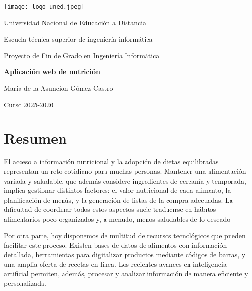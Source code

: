 \documentclass{article}
\begin{document}
\begin{titlepage}
\centering
\texttt{[image: logo-uned.jpeg]}

\vspace{1.5cm}

{\Large Universidad Nacional de Educación a Distancia\par}
\vspace{0.4cm}
{\large Escuela técnica superior de ingeniería informática\par}

\vspace{1.6cm}

{\large Proyecto de Fin de Grado en Ingeniería Informática\par}

\vspace{1.6cm}

{\LARGE \textbf{Aplicación web de nutrición}\par}

\vspace{2.2cm}

{\large María de la Asunción Gómez Castro\par}

\vfill

{\large Curso 2025-2026\par}
\end{titlepage}

\section*{Resumen}
El acceso a información nutricional y la adopción de dietas equilibradas representan un reto cotidiano para muchas personas. Mantener una alimentación variada y saludable, que además considere ingredientes de cercanía y temporada, implica gestionar distintos factores: el valor nutricional de cada alimento, la planificación de menús, y la generación de listas de la compra adecuadas. La dificultad de coordinar todos estos aspectos suele traducirse en hábitos alimentarios poco organizados y, a menudo, menos saludables de lo deseado.

Por otra parte, hoy disponemos de multitud de recursos tecnológicos que pueden facilitar este proceso. Existen bases de datos de alimentos con información detallada, herramientas para digitalizar productos mediante códigos de barras, y una amplia oferta de recetas en línea. Los recientes avances en inteligencia artificial permiten, además, procesar y analizar información de manera eficiente y personalizada.
\end{document}
